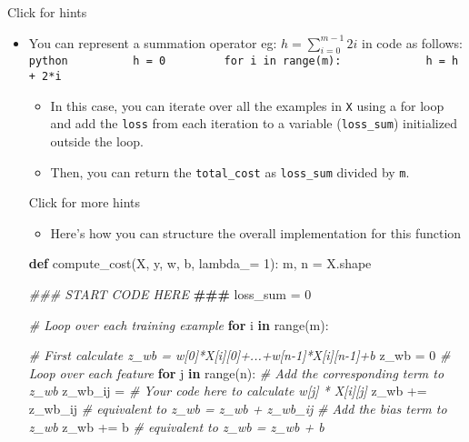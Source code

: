 \documentclass[11pt]{article}
\providecommand{\tightlist}{%
      \setlength{\itemsep}{0pt}\setlength{\parskip}{0pt}}
\newenvironment{Shaded}{}{}
\newcommand{\KeywordTok}[1]{\textcolor[rgb]{0.00,0.44,0.13}{\textbf{{#1}}}}
\newcommand{\DecValTok}[1]{\textcolor[rgb]{0.25,0.63,0.44}{{#1}}}
\newcommand{\CommentTok}[1]{\textcolor[rgb]{0.38,0.63,0.69}{\textit{{#1}}}}
\newcommand{\AlertTok}[1]{\textcolor[rgb]{1.00,0.00,0.00}{\textbf{{#1}}}}
\newcommand{\NormalTok}[1]{{#1}}
\newcommand{\ControlFlowTok}[1]{\textcolor[rgb]{0.00,0.44,0.13}{\textbf{{#1}}}}
\newcommand{\OperatorTok}[1]{\textcolor[rgb]{0.40,0.40,0.40}{{#1}}}
\newcommand{\BuiltInTok}[1]{{#1}}
\begin{document}
    Click for hints

\begin{itemize}
\item
  You can represent a summation operator eg:
  \(h = \sum\limits_{i = 0}^{m-1} 2i\) in code as follows:
  \texttt{python\ \ \ \ \ \ \ \ \ \ h\ =\ 0\ \ \ \ \ \ \ \ \ for\ i\ in\ range(m):\ \ \ \ \ \ \ \ \ \ \ \ \ h\ =\ h\ +\ 2*i}

  \begin{itemize}
  \item
    In this case, you can iterate over all the examples in \texttt{X}
    using a for loop and add the \texttt{loss} from each iteration to a
    variable (\texttt{loss\_sum}) initialized outside the loop.
  \item
    Then, you can return the \texttt{total\_cost} as \texttt{loss\_sum}
    divided by \texttt{m}.
  \end{itemize}

  Click for more hints

  \begin{itemize}
  \tightlist
  \item
    Here's how you can structure the overall implementation for this
    function
  \end{itemize}

\begin{Shaded}
\begin{Highlighting}[]
 \KeywordTok{def}\NormalTok{ compute\_cost(X, y, w, b, lambda\_}\OperatorTok{=} \DecValTok{1}\NormalTok{):}
\NormalTok{     m, n }\OperatorTok{=}\NormalTok{ X.shape}

     \CommentTok{\#\#\# START CODE HERE }\AlertTok{\#\#\#}
\NormalTok{     loss\_sum }\OperatorTok{=} \DecValTok{0} 

     \CommentTok{\# Loop over each training example}
     \ControlFlowTok{for}\NormalTok{ i }\KeywordTok{in} \BuiltInTok{range}\NormalTok{(m): }

         \CommentTok{\# First calculate z\_wb = w[0]*X[i][0]+...+w[n{-}1]*X[i][n{-}1]+b}
\NormalTok{         z\_wb }\OperatorTok{=} \DecValTok{0} 
         \CommentTok{\# Loop over each feature}
         \ControlFlowTok{for}\NormalTok{ j }\KeywordTok{in} \BuiltInTok{range}\NormalTok{(n): }
             \CommentTok{\# Add the corresponding term to z\_wb}
\NormalTok{             z\_wb\_ij }\OperatorTok{=} \CommentTok{\# Your code here to calculate w[j] * X[i][j]}
\NormalTok{             z\_wb }\OperatorTok{+=}\NormalTok{ z\_wb\_ij }\CommentTok{\# equivalent to z\_wb = z\_wb + z\_wb\_ij}
         \CommentTok{\# Add the bias term to z\_wb}
\NormalTok{         z\_wb }\OperatorTok{+=}\NormalTok{ b }\CommentTok{\# equivalent to z\_wb = z\_wb + b}


\end{Highlighting}
\end{Shaded}
\end{itemize}
\end{document}
